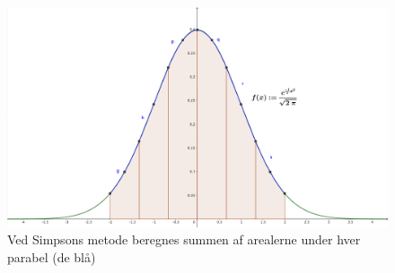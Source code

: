 \begin{figure}[H]
\begin{center}
  \includegraphics[width=\textwidth]{fig/standardnormalfordeling.png}
\end{center}
  \caption{Ved Simpsons metode beregnes summen af arealerne under hver parabel (de blå)}
\label{fig:standardnormalfordeling}
\end{figure}
 

